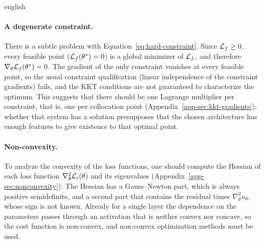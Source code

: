 \documentclass[0000.tex]{subfiles}
\begin{document}
\begin{hyphenrules}{english}
\paragraph{A degenerate constraint.}
There is a subtle problem with Equation~\eqref{eq:hard-constraint}. Since $\mathcal{L}_f\ge0$, every feasible point
($\mathcal{L}_f(\theta^{*})=0$) is a global minimizer of $\mathcal{L}_f$, and therefore $\nabla_\theta\mathcal{L}_f(\theta^{*})=0$.
The gradient of the only constraint vanishes at every feasible point, so the usual constraint
qualification (linear independence of the constraint gradients) fails, and the KKT conditions are not
guaranteed to characterize the optimum. This suggests that there should be one Lagrange multiplier per constraint, that is,
one per collocation point (Appendix~\ref{app-sec:kkt-gradients}); whether that system has a solution
presupposes that the chosen architecture has enough features to give existence to that optimal point.

\paragraph{Non-convexity.}
To analyze the convexity of the loss functions, one should compute the Hessian of each loss function
$\nabla^2_\theta\mathcal{L}_i(\theta)$ and its eigenvalues (Appendix~\ref{app-sec:nonconvexity}). The Hessian has
a Gauss--Newton part, which is always positive semidefinite, and a second part that contains the
residual times $\nabla^2_\theta u_\theta$, whose sign is not known. Already for a single layer the
dependence on the parameters passes through an activation that is neither convex nor concave, so the
cost function is non-convex, and non-convex optimization methods must be used.


\end{hyphenrules}
\end{document}
